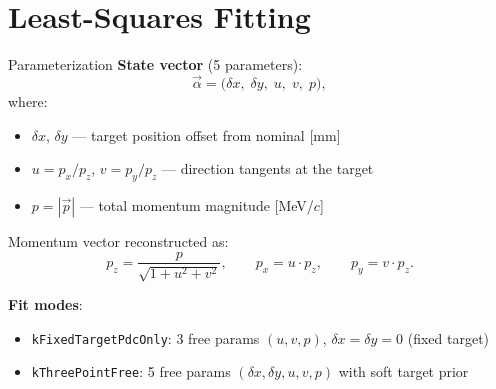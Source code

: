 \documentclass[aspectratio=169]{beamer}
\begin{document}
\section{Least-Squares Fitting}

\begin{frame}{Parameterization}
\small
\textbf{State vector} (5 parameters):
\[
\vec{\alpha} = \bigl(\delta x,\; \delta y,\; u,\; v,\; p\bigr),
\]
where:
\begin{itemize}
\item $\delta x$, $\delta y$ --- target position offset from nominal [mm]
\item $u = p_x / p_z$, $v = p_y / p_z$ --- direction tangents at the target
\item $p = |\vec{p}|$ --- total momentum magnitude [MeV/$c$]
\end{itemize}

Momentum vector reconstructed as:
\[
p_z = \frac{p}{\sqrt{1 + u^2 + v^2}}, \qquad
p_x = u \cdot p_z, \qquad
p_y = v \cdot p_z.
\]

\vspace{0.1cm}
\textbf{Fit modes}:
\begin{itemize}
\item \texttt{kFixedTargetPdcOnly}: 3 free params $(u, v, p)$, $\delta x = \delta y = 0$ (fixed target)
\item \texttt{kThreePointFree}: 5 free params $(\delta x, \delta y, u, v, p)$ with soft target prior
\end{itemize}
\end{frame}
\end{document}
